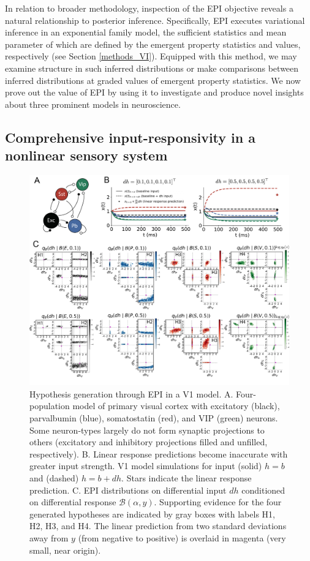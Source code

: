 \documentclass[11pt]{article}
\begin{document}
In relation to broader methodology, inspection of the EPI objective reveals a natural relationship to posterior inference.
Specifically, EPI executes variational inference in an exponential family model, the sufficient statistics and mean parameter of which are defined by the emergent property statistics and values, respectively (see Section \ref{methods_VI}).
Equipped with this method, we may examine structure in such inferred distributions or make comparisons between inferred distributions at graded values of emergent property statistics.
We now prove out the value of EPI by using it to investigate and produce novel insights about three prominent models in neuroscience.

\subsection{Comprehensive input-responsivity in a nonlinear sensory system} \label{results_V1}

\begin{figure}
\begin{center}
\includegraphics[scale=0.54]{figures/fig2/fig2.pdf}
\end{center}
\caption{\small Hypothesis generation through EPI in a V1 model.  A. Four-population model of primary visual cortex with excitatory (black), parvalbumin (blue), somatostatin (red), and VIP (green) neurons.   Some neuron-types largely do not form synaptic projections to others  (excitatory and inhibitory projections filled and unfilled, respectively).  B. Linear response predictions become inaccurate with greater input strength.  V1 model simulations for input (solid) $h=b$ and (dashed) $h = b + dh$. Stars indicate the linear response prediction.  C. EPI distributions on differential input $dh$ conditioned on differential response $\mathcal{B}(\alpha, y)$. Supporting evidence for the four generated hypotheses are indicated by gray boxes with labels H1, H2, H3, and H4. The linear prediction from two standard deviations away from $y$ (from negative to positive) is overlaid in magenta (very small, near origin). }
 \label{fig:V1_EPI}
\end{figure}
\end{document}
